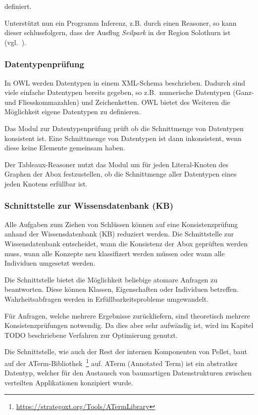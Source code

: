 definiert.

Unterstützt nun ein Programm Inferenz, z.B. durch einen Reasoner, so kann dieser schlussfolgern, dass der Ausflug \textit{Seilpark} in der Region Solothurn ist (vgl.~\cite[Abschnitt `Examples']{w3inference}).


\subsubsection{Datentypenprüfung}
\label{ssubsection:inferenz_pellet_datatypes}
In OWL werden Datentypen in einem XML-Schema beschrieben. Dadurch sind viele einfache Datentypen bereits gegeben, so z.B.\ numerische Datentypen (Ganz- und Fliesskommazahlen) und Zeichenketten. OWL bietet des Weiteren die Möglichkeit eigene Datentypen zu definieren.

Das Modul zur Datentypenprüfung prüft ob die Schnittmenge von Datentypen konsistent ist. Eine Schnittmenge von Datentypen ist dann inkonsistent, wenn diese keine Elemente gemeinsam haben.

Der Tableaux-Reasoner nutzt das Modul um für jeden Literal-Knoten des Graphen der Abox festzustellen, ob die Schnittmenge aller Datentypen eines jeden Knotens erfüllbar ist.

\subsubsection{Schnittstelle zur Wissensdatenbank (KB)}
\label{ssubsection:inferenz_pellet_kb}
Alle Aufgaben zum Ziehen von Schlüssen können auf eine Konsistenzprüfung anhand der Wissensdatenbank (KB) reduziert werden. Die Schnittstelle zur Wissensdatenbank entscheidet, wann die Konsistenz der Abox geprüften werden muss, wann alle Konzepte neu klassifizert werden müssen oder wann alle Individuen umgesetzt werden. %

Die Schnittstelle bietet die Möglichkeit beliebige atomare Anfragen zu beantworten. Diese können Klassen, Eigenschaften oder Individuen betreffen. Wahrheitsabfragen werden in Erfüllbarkeitsprobleme umgewandelt.

Für Anfragen, welche mehrere Ergebnisse zurückliefern, sind theoretisch mehrere Konsistenzprüfungen notwendig. Da dies aber sehr aufwändig ist, wird im Kapitel TODO beschriebene Verfahren zur Optimierung genutzt.

Die Schnittstelle, wie auch der Rest der internen Komponenten von Pellet, baut auf der ATerm-Bibliothek~\footnote{\url{https://strategoxt.org/Tools/ATermLibrary}} auf. ATerm (Annotated Term) ist ein abstratker Datentyp, welcher für den Austausch von baumartigen Datenstrukturen zwischen verteilten Applikationen konzipiert wurde.

